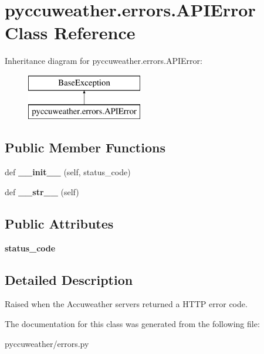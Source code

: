\hypertarget{classpyccuweather_1_1errors_1_1_a_p_i_error}{}\section{pyccuweather.\+errors.\+A\+P\+I\+Error Class Reference}
\label{classpyccuweather_1_1errors_1_1_a_p_i_error}
Inheritance diagram for pyccuweather.\+errors.\+A\+P\+I\+Error\+:\begin{figure}[H]
\begin{center}
\leavevmode
\includegraphics[height=2.000000cm]{classpyccuweather_1_1errors_1_1_a_p_i_error}
\end{center}
\end{figure}
\subsection*{Public Member Functions}
\begin{DoxyCompactItemize}
\item 
\hypertarget{classpyccuweather_1_1errors_1_1_a_p_i_error_a8d29dd91479ec96b56213b0c38232869}{}def {\bfseries \+\_\+\+\_\+init\+\_\+\+\_\+} (self, status\+\_\+code)\label{classpyccuweather_1_1errors_1_1_a_p_i_error_a8d29dd91479ec96b56213b0c38232869}

\item 
\hypertarget{classpyccuweather_1_1errors_1_1_a_p_i_error_a0fedcce781a53c3e8914370aa62bcf41}{}def {\bfseries \+\_\+\+\_\+str\+\_\+\+\_\+} (self)\label{classpyccuweather_1_1errors_1_1_a_p_i_error_a0fedcce781a53c3e8914370aa62bcf41}

\end{DoxyCompactItemize}
\subsection*{Public Attributes}
\begin{DoxyCompactItemize}
\item 
\hypertarget{classpyccuweather_1_1errors_1_1_a_p_i_error_aacf9ec6422944075b248b3b3c53af924}{}{\bfseries status\+\_\+code}\label{classpyccuweather_1_1errors_1_1_a_p_i_error_aacf9ec6422944075b248b3b3c53af924}

\end{DoxyCompactItemize}


\subsection{Detailed Description}
\begin{DoxyVerb}Raised when the Accuweather servers returned a HTTP error code.
\end{DoxyVerb}
 

The documentation for this class was generated from the following file\+:\begin{DoxyCompactItemize}
\item 
pyccuweather/errors.\+py\end{DoxyCompactItemize}
